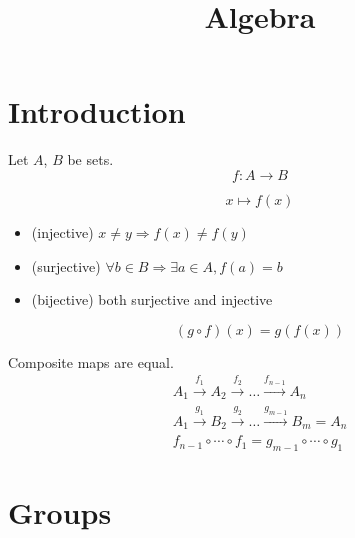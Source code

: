 \documentclass{blog}
\title{Algebra}
\begin{document}
\maketitle
\tableofcontents
\section{Introduction}
\begin{definition}[mapping] Let $A$, $B$ be sets.
    \begin{equation}
        \label{eq:mapping}
        f : A \to B
    \end{equation}
\end{definition}

\begin{definition}[$f$]
    \begin{equation}
        \label{eq:fx}
        x \mapsto f(x)
    \end{equation}

    \begin{itemize}
        \item (injective) $x \neq y \Rightarrow f(x) \neq f(y)$
        \item (surjective) $\forall b \in B \Rightarrow \exists a \in A, f(a) = b$
        \item (bijective) both surjective and injective
    \end{itemize}
\end{definition}

\begin{definition}
    \begin{equation}
        \label{eq:composite-map}
        (g \circ f)(x) = g(f(x))
    \end{equation}
\end{definition}

\begin{definition}[commutative]
    Composite maps are equal.
    \begin{gather*}
        A_{1} \xrightarrow{f_{1}} A_{2} \xrightarrow{f_{2}} \dots \xrightarrow{f_{n-1}} A_{n} \\
        A_{1} \xrightarrow{g_{1}} B_{2} \xrightarrow{g_{2}} \dots \xrightarrow{g_{m-1}} B_{m} = A_{n} \\
        f_{n-1} \circ \cdots \circ f_{1} = g_{m-1} \circ \cdots \circ g_{1}
    \end{gather*}
\end{definition}

\section{Groups}
\end{document}
